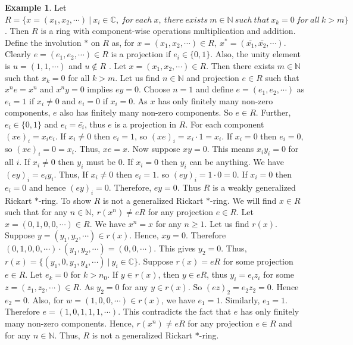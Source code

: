 \documentclass[11pt, one side,emlines]{amsart}
\theoremstyle{definition}
\newtheorem{example}[lemma]{Example}
\numberwithin{equation}{section} \thispagestyle{empty} \voffset
\begin{document}
\begin{example}
Let $R=\{x=(x_1,x_2,\cdots )~|~ x_i\in \mathbb{C} ,~ for ~each ~x,~ there ~ exists~ m\in \mathbb{N} ~such ~that~ x_k=0 ~for ~all~ k >  m\}$.
Then $R$ is a ring with component-wise operations multiplication and addition. Define the involution $*$ on $R$ as, for $x=(x_1,x_2,\cdots )\in R,~ x^*=(\bar{x_1},\bar{x_2},\cdots )$. Clearly $e=(e_1,e_2,\cdots )\in R $ is a projection if $e_i\in \{0,1\}$. Also, the unity element is $u=(1,1,\cdots )$ and $u\notin R$ . Let $x=(x_1,x_2,\cdots )\in R$. Then there  exists $m\in \mathbb{N}$ such that $x_k=0$ for all $k >  m$. Let us find $n\in \mathbb{N}$ and projection $e \in R$ such that $x^ne=x^n$ and $x^ny=0$ implies $ey=0$. Choose $n=1$ and define $e=(e_1,e_2,\cdots )$ as $e_i=1$ if $x_i\neq 0$ and $e_i=0$ if $x_i= 0$. As $x$ has only finitely many non-zero components, $e$ also has finitely many non-zero components. So  $e \in R$. Further, $e_i\in \{0,1\}$ and $e_i=\bar{e_i}$, thus $e$ is a projection in $R$. For each component $(xe)_i=x_ie_i$. If $x_i\neq 0$ then $e_i=1$, so $(xe)_i=x_i\cdot 1=x_i$. If $x_i= 0$ then $e_i=0$, so $(xe)_i=0=x_i$. Thus, $xe=x$. Now suppose $xy=0$. This means $x_iy_i=0$ for all $i$. If $x_i\neq 0$ then $y_i$ must be 0. If $x_i= 0$ then $y_i$ can be anything. We have $(ey)_i=e_iy_i$. Thus, If $x_i\neq 0$ then $e_i=1$. so $(ey)_i= 1\cdot 0=0$. If $x_i= 0$ then $e_i=0$ and hence $(ey)_i= 0$. Therefore, $ey=0$. Thus $R$ is a weakly generalized Rickart $*$-ring.
 To show $R$ is not a generalized Rickart $*$-ring. We will find $x\in R$ such that for any $n\in \mathbb{N},~ r(x^n)\neq eR$ for any projection $e\in R$. Let $x=(0,1,0,0, \cdots)\in R$. We have $x^n=x$ for any $n\geq 1$. Let us find $r(x)$. Suppose $y=(y_1,y_2, \cdots )\in r(x)$. Hence, $xy=0$. Therefore $(0,1,0,0, \cdots)\cdot (y_1,y_2, \cdots )=(0,0, \cdots )$. This gives $y_2=0$. Thus, $r(x)=\{(y_1,0,y_3,y_4, \cdots )~|~y_i\in \mathbb{C}\}$. Suppose  $r(x)=eR$ for some projection $e \in R$. Let $e_k=0$ for $k>n_0$. If $y\in r(x)$, then  $y\in eR$, thus $y_i=e_iz_i$ for some $z=(z_1,z_2, \cdots )\in R$. As $y_2=0$ for any $y\in r(x)$. So $(ez)_2=e_2z_2=0$. Hence $e_2=0$. Also, for $w=(1,0,0,\cdots )\in r(x)$, we have $e_1=1$. Similarly, $e_3=1$. Therefore $e=(1,0,1,1,1, \cdots )$. This contradicts the fact that $e$ has only finitely many non-zero components. Hence,  $r(x^n)\neq eR$ for any projection $e\in R$  and for any $n\in \mathbb{N}$. Thus, $R$ is not a generalized Rickart $*$-ring.
\end{example}
\end{document}
